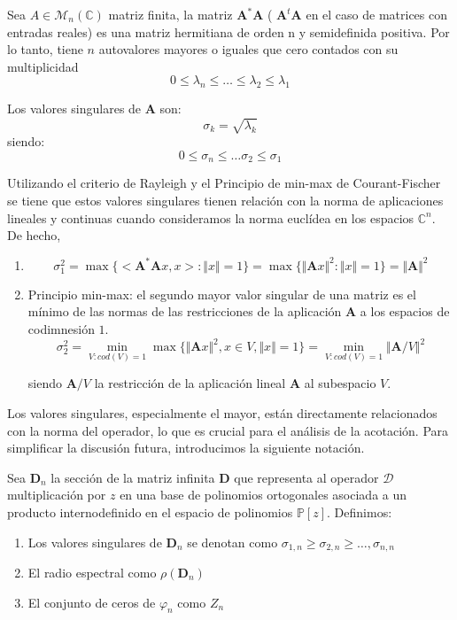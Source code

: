 \begin{definition}\label{def:singular_values}
	Sea $A \in \mathcal{M}_{n}(\mathbb{C})$ matriz finita, la matriz $\mathbf{A}^{*}\mathbf{A}$  ( $\mathbf{A}^{t}\mathbf{A}$ en el caso de matrices con entradas reales) es una matriz hermitiana de orden n y semidefinida positiva. Por lo tanto, tiene $n$ autovalores mayores o iguales que cero contados con su multiplicidad
	$$
		0 \leq \lambda_{n}\leq \dots \leq \lambda_{2} \leq \lambda_{1}
	$$


	\noindent Los valores singulares de $\mathbf{A}$ son:
	$$
		\sigma_{k}= \sqrt{\lambda_{k}}
	$$
	\noindent siendo:
	$$
		0 \leq \sigma_{n} \leq \dots \sigma_{2} \leq \sigma_{1}
	$$

	\noindent Utilizando el criterio de Rayleigh y el Principio de min-max de  Courant-Fischer \cite{gallier2017spectral} se tiene que estos valores singulares tienen relación con la norma de aplicaciones lineales y continuas cuando consideramos la norma euclídea en los espacios $\mathbb{C}^n$. De hecho,
	\begin{enumerate}
		\item $$
			      \sigma_{1}^2 =
			      \max \{ <\mathbf{A}^{*	}\mathbf{A}x,x>: \Vert x \Vert =1 \}
			      = \max \{\Vert \mathbf{A} x \Vert^2 : \Vert x \Vert =1\}=
			      \Vert \mathbf{A} \Vert^2
		      $$
		\item Principio min-max: el segundo mayor valor singular de una matriz es el mínimo de las normas de las restricciones de la aplicación $\mathbf{A}$ a los espacios de codimnesión $1$.
		      $$
			      \sigma_{2}^2 = \min_{V: cod(V)=1} \max \{\Vert \mathbf{A}x \Vert^2 , x\in V, \Vert x \Vert =1\}= \min_{V: cod(V)=1} \Vert \mathbf{A}/V \Vert^2
		      $$

		      \noindent siendo $\mathbf{A}/V$ la restricción de la aplicación lineal $\mathbf{A}$ al subespacio $V$.

	\end{enumerate}
\end{definition}

Los valores singulares, especialmente el mayor, están directamente relacionados con la norma del operador, lo que es crucial para el análisis de la acotación. Para simplificar la discusión futura, introducimos la siguiente notación.

\begin{definition}\label{def:notation_matrix_sections}
	Sea $\mathbf{D}_{n}$ la sección de la matriz infinita $\mathbf{D}$ que representa al operador $\mathcal{D}$ multiplicación por $z$ en una base de polinomios ortogonales asociada a un producto internodefinido en el espacio de polinomios $\mathbb{P}[z]$. Definimos:
	\begin{enumerate}
		\item Los valores singulares de $\mathbf{D}_{n}$ se denotan como $\sigma_{1,n} \ge \sigma_{2,n} \ge \ldots, \sigma_{n,n}$
		\item El radio espectral como $\rho(\mathbf{D}_{n})$
		\item El conjunto de ceros de $\varphi_n$ como $Z_{n}$
	\end{enumerate}
\end{definition}

